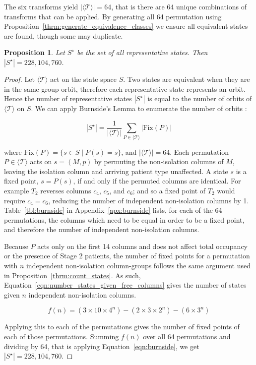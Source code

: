 \documentclass{article}
\newtheorem{proposition}{Proposition}
\begin{document}
The six transforms yield $|\langle\mathcal{T}\rangle| = 64$, that is there are
64 unique combinations of transforms that can be applied.
By generating all 64 permutation using
Proposition~\ref{thrm:generate_equivalence_classes} we ensure all equivalent
states are found, though some may duplicate.


\begin{proposition}\label{thrm:count_representative_states}
Let $S^{\star}$ be the set of all representative states.
Then $|S^{\star}| = 228,104,760$.
\end{proposition}

\begin{proof}
Let $\langle \mathcal{T} \rangle$ act on the state space $S$.
Two states are equivalent when they are in the same group orbit,
therefore each representative state represents an orbit.
Hence the number of representative states $|S^{\star}|$ is equal to the number
of orbits of $\langle \mathcal{T} \rangle$ on $S$.
We can apply Burnside's Lemma to enumerate the number of orbits
\cite[p.~488]{gallian20}:

\begin{equation}\label{eqn:burnside}
|S^{\star}| = \frac{1}{|\langle\mathcal{T}\rangle|} \sum_{P \in \langle\mathcal{T}\rangle} |\text{Fix}(P)|
\end{equation}

where $\text{Fix}(P) = \{s \in S \; | \; P(s) = s\}$, and
$|\langle\mathcal{T}\rangle| = 64$.
Each permutation $P \in \langle\mathcal{T}\rangle$ acts on $s = (M, p)$ by
permuting the non-isolation columns of $M$, leaving the isolation column and
arriving patient type unaffected.
A state $s$ is a fixed point, $s = P(s)$, if and only if the permuted columns
are identical.
For example $T_2$ reverses columns $c_4$, $c_5$, and $c_6$; and so a fixed point
of $T_2$ would require $c_4 = c_6$, reducing the number of independent
non-isolation columns by 1.
Table~\ref{tbl:burnside} in Appendix~\ref{apx:burnside} lists, for each of the
64 permutations, the columns which need to be equal in order to be a fixed
point, and therefore the number of independent non-isolation columns.

Because $P$ acts only on the first 14 columns and does not affect total
occupancy or the presence of Stage 2 patients, the number of fixed points
for a permutation with $n$ independent non-isolation column-groups follows the
same argument used in Proposition~\ref{thrm:count_states}.
As such, Equation~\ref{eqn:number_states_given_free_columns} gives the number of
states given $n$ independent non-isolation columns.

\begin{equation}\label{eqn:number_states_given_free_columns}
f(n) = (3 \times 10 \times 4^{n}) - (2 \times 3 \times 2^{n}) - (6 \times 3^{n})
\end{equation}

Applying this to each of the permutations gives the number of fixed points of
each of those permutations.
Summing $f(n)$ over all 64 permutations and dividing by 64, that is applying
Equation~\ref{eqn:burnside}, we get $|S^{\star}| = 228,104,760$.
\end{proof}
\end{document}
